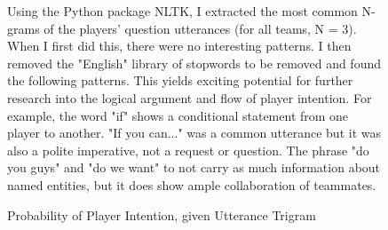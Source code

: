 \begin{figure}[h!]
    \centering
    \caption{Using the Python package NLTK, I extracted the most common N-grams of the players' question utterances (for all teams, N = 3). When I first did this, there were no interesting patterns. I then removed the "English" library of stopwords to be removed and found the following patterns. This yields exciting potential for further research into the logical argument and flow of player intention. For example, the word "if" shows a conditional statement from one player to another. "If you can..." was a common utterance but it was also a polite imperative, not a request or question. The phrase "do you guys" and "do we want" to not carry as much information about named entities, but it does show ample collaboration of teammates. }
\end{figure}

\begin{figure}[h!]
    \centering    
    \caption{Probability of Player Intention, given Utterance Trigram}
\end{figure}





